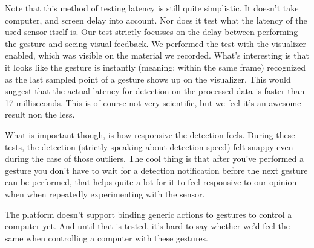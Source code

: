 \documentclass[a4paper]{article}
\begin{document}
  Note that this method of testing latency is still quite simplistic. It doesn't
  take computer, and screen delay into account. Nor does it test what the
  latency of the used sensor itself is. Our test strictly focusses on the delay
  between performing the gesture and seeing visual feedback. We performed the
  test with the visualizer enabled, which was visible on the material we
  recorded. What's interesting is that it looks like the gesture is instantly
  (meaning; within the same frame) recognized as the last sampled point of a
  gesture shows up on the visualizer. This would suggest that the actual
  latency for detection on the processed data is faster than 17 milliseconds.
  This is of course not very scientific, but we feel it's an awesome result non
  the less.

  What is important though, is how responsive the detection feels. During these
  tests, the detection (strictly speaking about detection speed) felt snappy even
  during the case of those outliers. The cool thing is that after you've
  performed a gesture you don't have to wait for a detection notification before
  the next gesture can be performed, that helps quite a lot for it to feel
  responsive to our opinion when when repeatedly experimenting with the sensor.

  The platform doesn't support binding
  generic actions to gestures to control a computer yet. And until that is
  tested, it's hard to say whether we'd feel the same when controlling a
  computer with these gestures.
\end{document}
